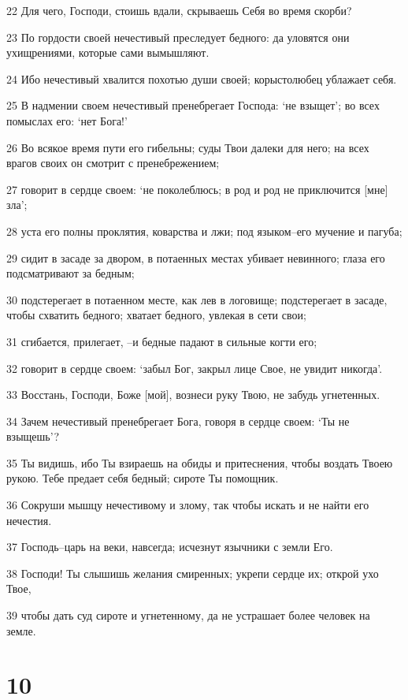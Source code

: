 \par 22 Для чего, Господи, стоишь вдали, скрываешь Себя во время скорби?
\par 23 По гордости своей нечестивый преследует бедного: да уловятся они ухищрениями, которые сами вымышляют.
\par 24 Ибо нечестивый хвалится похотью души своей; корыстолюбец ублажает себя.
\par 25 В надмении своем нечестивый пренебрегает Господа: `не взыщет'; во всех помыслах его: `нет Бога!'
\par 26 Во всякое время пути его гибельны; суды Твои далеки для него; на всех врагов своих он смотрит с пренебрежением;
\par 27 говорит в сердце своем: `не поколеблюсь; в род и род не приключится [мне] зла';
\par 28 уста его полны проклятия, коварства и лжи; под языком--его мучение и пагуба;
\par 29 сидит в засаде за двором, в потаенных местах убивает невинного; глаза его подсматривают за бедным;
\par 30 подстерегает в потаенном месте, как лев в логовище; подстерегает в засаде, чтобы схватить бедного; хватает бедного, увлекая в сети свои;
\par 31 сгибается, прилегает, --и бедные падают в сильные когти его;
\par 32 говорит в сердце своем: `забыл Бог, закрыл лице Свое, не увидит никогда'.
\par 33 Восстань, Господи, Боже [мой], вознеси руку Твою, не забудь угнетенных.
\par 34 Зачем нечестивый пренебрегает Бога, говоря в сердце своем: `Ты не взыщешь'?
\par 35 Ты видишь, ибо Ты взираешь на обиды и притеснения, чтобы воздать Твоею рукою. Тебе предает себя бедный; сироте Ты помощник.
\par 36 Сокруши мышцу нечестивому и злому, так чтобы искать и не найти его нечестия.
\par 37 Господь--царь на веки, навсегда; исчезнут язычники с земли Его.
\par 38 Господи! Ты слышишь желания смиренных; укрепи сердце их; открой ухо Твое,
\par 39 чтобы дать суд сироте и угнетенному, да не устрашает более человек на земле.

\chapter{10}

